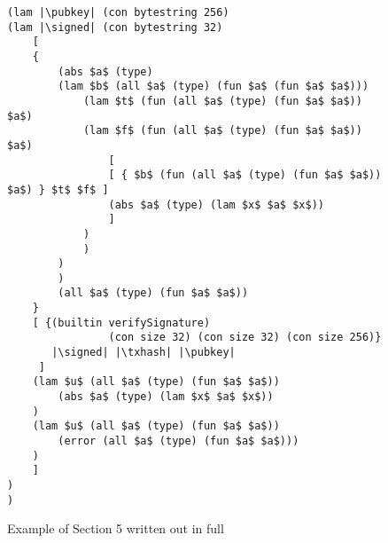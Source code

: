 \documentclass[../plutus-core-specification.tex]{subfiles}
\begin{document}
\begin{figure*}[h]  %
\begin{lstlisting}
(lam |\pubkey| (con bytestring 256)
(lam |\signed| (con bytestring 32)
    [ 
    {
        (abs $a$ (type)
        (lam $b$ (all $a$ (type) (fun $a$ (fun $a$ $a$)))
            (lam $t$ (fun (all $a$ (type) (fun $a$ $a$)) $a$)
            (lam $f$ (fun (all $a$ (type) (fun $a$ $a$)) $a$)
                [
                [ { $b$ (fun (all $a$ (type) (fun $a$ $a$)) $a$) } $t$ $f$ ]
                (abs $a$ (type) (lam $x$ $a$ $x$))
                ]
            )
            )
        )
        )
        (all $a$ (type) (fun $a$ $a$))
    }
    [ {(builtin verifySignature)
                (con size 32) (con size 32) (con size 256)}
       |\signed| |\txhash| |\pubkey|
     ]
    (lam $u$ (all $a$ (type) (fun $a$ $a$))
        (abs $a$ (type) (lam $x$ $a$ $x$))
    )
    (lam $u$ (all $a$ (type) (fun $a$ $a$))
        (error (all $a$ (type) (fun $a$ $a$)))
    )
    ]
)
)
\end{lstlisting}
\caption{Example of Section 5 written out in full}
\label{fig:Continuized_Let_Example}
\end{figure*}
\end{document}
